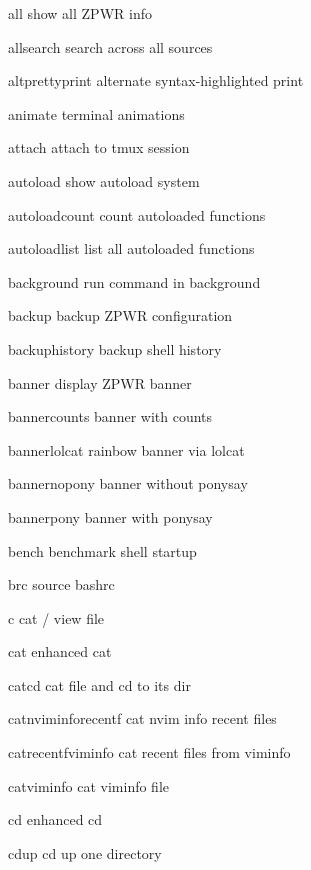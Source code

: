 \documentclass[11pt,a4paper,twoside]{book}
\begin{document}
all                        show all ZPWR info

allsearch                  search across all sources

altprettyprint             alternate syntax-highlighted print

animate                    terminal animations

\begin{codebox}
attach                     attach to tmux session\\
\end{codebox}

autoload                   show autoload system

autoloadcount              count autoloaded functions

autoloadlist               list all autoloaded functions

background                 run command in background

backup                     backup ZPWR configuration

backuphistory              backup shell history

banner                     display ZPWR banner

bannercounts               banner with counts

bannerlolcat               rainbow banner via lolcat

bannernopony               banner without ponysay

bannerpony                 banner with ponysay

bench                      benchmark shell startup

brc                        source bashrc

c                          cat / view file

cat                        enhanced cat

catcd                      cat file and cd to its dir

\begin{codebox}
catnviminforecentf         cat nvim info recent files\\
\end{codebox}

catrecentfviminfo          cat recent files from viminfo

catviminfo                 cat viminfo file

cd                         enhanced cd

cdup                       cd up one directory
\end{document}
